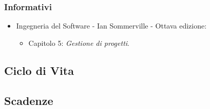 \subsubsection{Informativi}
	\begin{itemize}
		\item Ingegneria del Software - Ian Sommerville - Ottava edizione:
		\begin{itemize}
			\item Capitolo 5: \textit{Gestione di progetti}.
		\end{itemize}
	\end{itemize}
\subsection{Ciclo di Vita}
\subsection{Scadenze}
